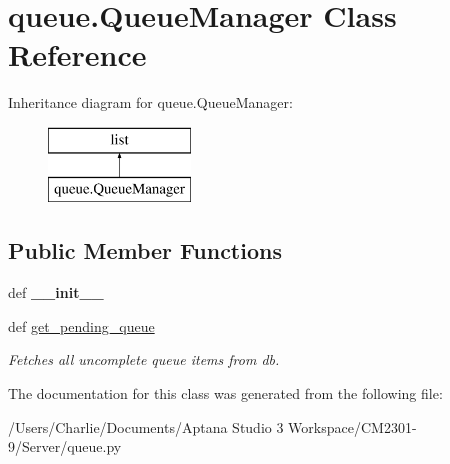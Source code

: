 \hypertarget{classqueue_1_1_queue_manager}{\section{queue.\-Queue\-Manager Class Reference}
\label{classqueue_1_1_queue_manager}
}
Inheritance diagram for queue.\-Queue\-Manager\-:\begin{figure}[H]
\begin{center}
\leavevmode
\includegraphics[height=2.000000cm]{classqueue_1_1_queue_manager}
\end{center}
\end{figure}
\subsection*{Public Member Functions}
\begin{DoxyCompactItemize}
\item 
\hypertarget{classqueue_1_1_queue_manager_ae77c301f551c82782848d0523ae1595c}{def {\bfseries \-\_\-\-\_\-init\-\_\-\-\_\-}}\label{classqueue_1_1_queue_manager_ae77c301f551c82782848d0523ae1595c}

\item 
\hypertarget{classqueue_1_1_queue_manager_a361e2ff2a1dbeb3491964a2a48af1981}{def \hyperlink{classqueue_1_1_queue_manager_a361e2ff2a1dbeb3491964a2a48af1981}{get\-\_\-pending\-\_\-queue}}\label{classqueue_1_1_queue_manager_a361e2ff2a1dbeb3491964a2a48af1981}

\begin{DoxyCompactList}\small\item\em Fetches all uncomplete queue items from db. \end{DoxyCompactList}\end{DoxyCompactItemize}


The documentation for this class was generated from the following file\-:\begin{DoxyCompactItemize}
\item 
/\-Users/\-Charlie/\-Documents/\-Aptana Studio 3 Workspace/\-C\-M2301-\/9/\-Server/queue.\-py\end{DoxyCompactItemize}
